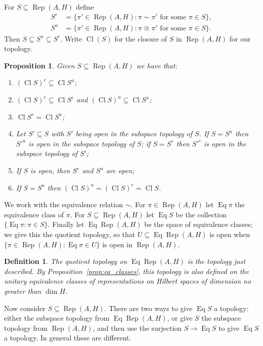 \documentclass[a4paper,11pt]{article}
\newcommand{\Rep}{\operatorname{Rep}}
\newcommand{\Cl}{\operatorname{Cl}}
\newcommand{\Eq}{\operatorname{Eq}}
\newtheorem{proposition}[lemma]{Proposition}
\newtheorem{definition}[lemma]{Definition}
\begin{document}
For $S \subseteq \Rep(A,H)$ define
\begin{align*}
S^e &= \{ \pi'\in\Rep(A,H) : \pi\sim\pi' \text{ for some } \pi\in S \}, \\
S^u &= \{ \pi'\in\Rep(A,H) : \pi\cong\pi' \text{ for some } \pi\in S \}.
\end{align*}
Then $S \subseteq S^u \subseteq S^e$.  Write $\Cl(S)$ for the closure of
$S$ in $\Rep(A,H)$ for our topology.

\begin{proposition}\label{prop:fell_top_props}
Given $S\subseteq\Rep(A,H)$ we have that:
\begin{enumerate}
\item $(\Cl S)^e \subseteq \Cl S^u$;
\item $(\Cl S)^e \subseteq \Cl S^e$ and $(\Cl S)^u \subseteq \Cl S^u$;
\item $\Cl S^e = \Cl S^u$;
\item Let $S' \subseteq S$ with $S'$ being open in the subspace topology
of $S$.  If $S=S^u$ then ${S'}^u$ is open in the subspace topology of $S$;
if $S=S^e$ then ${S'}^e$ is open in the subspace topology of $S'$;
\item\label{prop:fell_top_props:one}
 If $S$ is open, then $S^e$ and $S^u$ are open;
\item If $S = S^u$ then $(\Cl S)^u = (\Cl S)^e = \Cl S$.
\end{enumerate}
\end{proposition}

We work with the equivalence relation $\sim$.  For $\pi\in\Rep(A,H)$ let
$\Eq\pi$ the equivalence class of $\pi$.  For $S\subseteq\Rep(A,H)$ let
$\Eq S$ be the collection $\{\Eq\pi : \pi \in S\}$.  Finally let $\Eq\Rep(A,H)$
be the space of equivalence classes; we give this the quotient topology, so
that $U\subseteq \Eq\Rep(A,H)$ is open when $\{\pi\in\Rep(A,H):\Eq\pi\in U\}$
is open in $\Rep(A,H)$.

\begin{definition}\label{defn:quot_top}
The \emph{quotient topology} on $\Eq\Rep(A,H)$ is the topology just described.
By Proposition~\ref{prop:eq_classes}, this topology is also defined on the
unitary equivalence classes of representations on Hilbert spaces of dimension no
greater than $\dim H$.
\end{definition}

Now consider $S\subseteq \Rep(A,H)$.  There are two ways to give $\Eq S$ a
topology: either the subspace topology from $\Eq\Rep(A,H)$, or give $S$ the
subspace topology from $\Rep(A,H)$, and then use the surjection $S\rightarrow
\Eq S$ to give $\Eq S$ a topology.  In general these are different.
\end{document}
